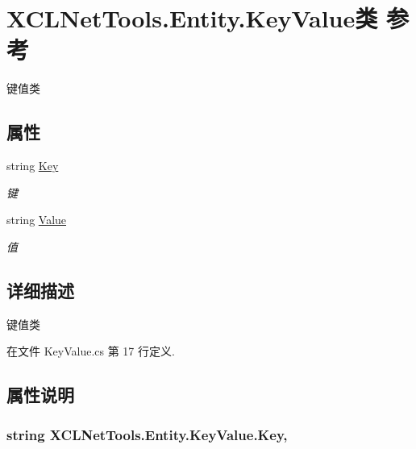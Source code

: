 \hypertarget{class_x_c_l_net_tools_1_1_entity_1_1_key_value}{\section{X\-C\-L\-Net\-Tools.\-Entity.\-Key\-Value类 参考}
\label{class_x_c_l_net_tools_1_1_entity_1_1_key_value}
}


键值类  


\subsection*{属性}
\begin{DoxyCompactItemize}
\item 
string \hyperlink{class_x_c_l_net_tools_1_1_entity_1_1_key_value_a33e2f7bfdcc6a1dce560304a4450cf08}{Key}
\begin{DoxyCompactList}\small\item\em 键 \end{DoxyCompactList}\item 
string \hyperlink{class_x_c_l_net_tools_1_1_entity_1_1_key_value_a9ec3c76143930f64c1e0de2074514bae}{Value}
\begin{DoxyCompactList}\small\item\em 值 \end{DoxyCompactList}\end{DoxyCompactItemize}


\subsection{详细描述}
键值类 



在文件 Key\-Value.\-cs 第 17 行定义.



\subsection{属性说明}
\hypertarget{class_x_c_l_net_tools_1_1_entity_1_1_key_value_a33e2f7bfdcc6a1dce560304a4450cf08}{
\subsubsection[{Key}]{\setlength{\rightskip}{0pt plus 5cm}string X\-C\-L\-Net\-Tools.\-Entity.\-Key\-Value.\-Key\hspace{0.3cm}{\ttfamily [get]}, {\ttfamily [set]}}}\label{class_x_c_l_net_tools_1_1_entity_1_1_key_value_a33e2f7bfdcc6a1dce560304a4450cf08}


